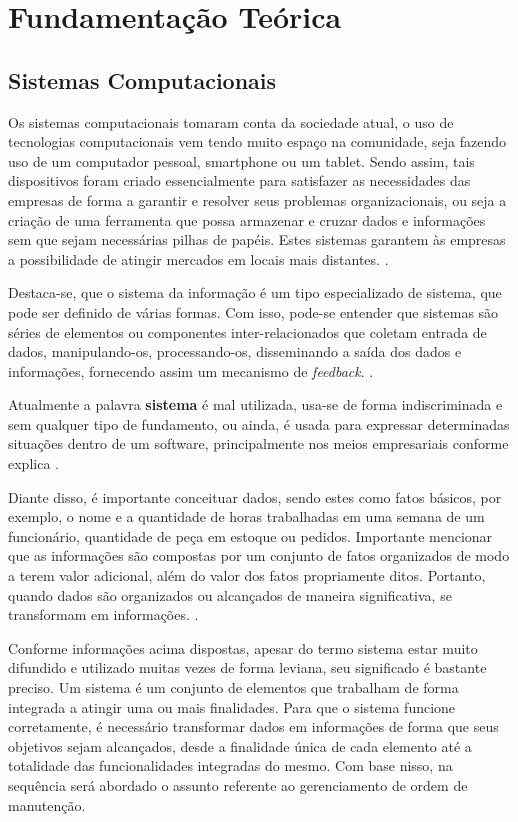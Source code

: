 \chapter{Fundamentação Teórica}

\section{Sistemas Computacionais}

Os sistemas computacionais tomaram conta da sociedade atual, o uso de tecnologias computacionais vem tendo muito espaço na comunidade, seja fazendo uso de um computador pessoal, smartphone ou um tablet. Sendo assim, tais dispositivos foram criado essencialmente para satisfazer as necessidades das empresas de forma a garantir e resolver seus problemas organizacionais, ou seja a criação de uma ferramenta que possa armazenar e cruzar dados e informações sem que sejam necessárias pilhas de papéis. Estes sistemas garantem às empresas a possibilidade de atingir mercados em locais mais distantes. \cite{MATTIOLI2020}.

Destaca-se, que o sistema da informação é um tipo especializado de sistema, que pode ser definido de várias formas. Com isso, pode-se entender que sistemas são séries de elementos ou componentes inter-relacionados que coletam entrada de dados, manipulando-os, processando-os, disseminando a saída dos dados e informações, fornecendo assim um mecanismo de \textit{feedback}. \cite{STAIR2008}.

Atualmente a palavra \textbf{sistema} é mal utilizada, usa-se de forma indiscriminada e sem qualquer tipo de fundamento, ou ainda, é usada para expressar determinadas situações dentro de um software, principalmente nos meios empresariais conforme explica \cite{ROSSINI2006}.

Diante disso, é importante conceituar dados, sendo estes como fatos básicos, por exemplo, o nome e a quantidade de horas trabalhadas em uma semana de um funcionário, quantidade de peça em estoque ou pedidos. Importante mencionar que as informações são compostas por um conjunto de fatos organizados de modo a terem valor adicional, além do valor dos fatos propriamente ditos. Portanto, quando dados são organizados ou alcançados de maneira significativa, se transformam em informações. \cite{STAIR2008}.

Conforme informações acima dispostas, apesar do termo sistema estar muito difundido e utilizado muitas vezes de forma leviana, seu significado é bastante preciso. Um sistema é um conjunto de elementos que trabalham de forma integrada a atingir uma ou mais finalidades.
Para que o sistema funcione corretamente, é necessário transformar dados em informações de forma que seus objetivos sejam alcançados, desde a finalidade única de cada elemento até a totalidade das funcionalidades integradas do mesmo.
Com base nisso, na sequência será abordado o assunto referente ao gerenciamento de ordem de manutenção.

